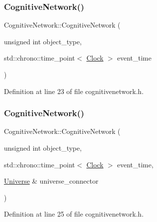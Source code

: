 \subsubsection{\texorpdfstring{Cognitive\+Network()}{CognitiveNetwork()}\hspace{0.1cm}{\footnotesize\ttfamily [3/4]}}
{\footnotesize\ttfamily Cognitive\+Network\+::\+Cognitive\+Network (\begin{DoxyParamCaption}\item[{unsigned int}]{object\+\_\+type,  }\item[{std\+::chrono\+::time\+\_\+point$<$ \hyperlink{universe_8h_a0ef8d951d1ca5ab3cfaf7ab4c7a6fd80}{Clock} $>$}]{event\+\_\+time }\end{DoxyParamCaption})\hspace{0.3cm}{\ttfamily [inline]}}



Definition at line 23 of file cognitivenetwork.\+h.

\mbox{\label{class_cognitive_network_a6ec49dcc8cc58cded71983291629179c}} 
\subsubsection{\texorpdfstring{Cognitive\+Network()}{CognitiveNetwork()}\hspace{0.1cm}{\footnotesize\ttfamily [4/4]}}
{\footnotesize\ttfamily Cognitive\+Network\+::\+Cognitive\+Network (\begin{DoxyParamCaption}\item[{unsigned int}]{object\+\_\+type,  }\item[{std\+::chrono\+::time\+\_\+point$<$ \hyperlink{universe_8h_a0ef8d951d1ca5ab3cfaf7ab4c7a6fd80}{Clock} $>$}]{event\+\_\+time,  }\item[{\hyperlink{class_universe}{Universe} \&}]{universe\+\_\+connector }\end{DoxyParamCaption})\hspace{0.3cm}{\ttfamily [inline]}}



Definition at line 25 of file cognitivenetwork.\+h.

